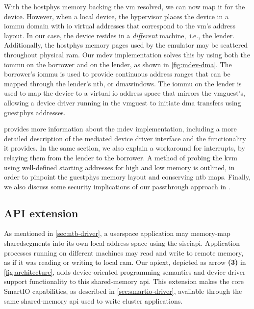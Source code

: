 With the \gls{hostphys} memory backing the \gls{vm} resolved, we can now map it for the device.
%
However, when  a local device, the \gls{hypervisor} places the device in a \gls{iommu} domain with \gls{io} virtual addresses that correspond to the \gls{vm}'s address layout.
%
In our case, the device resides in a \emph{different} machine,~i.e., the \gls{lender}.
%
Additionally, the \gls{hostphys} memory pages used by the \gls{emulator} may be scattered throughout physical \gls{ram}.
%
Our \gls{mdev} implementation solves this by using both the \gls{iommu} on the \gls{borrower} and on the \gls{lender}, as shown in \cref{fig:mdev-dma}.
%
The \gls{borrower}'s \gls{iommu} is used to provide continuous address ranges that can be mapped through the \gls{lender}'s \gls{ntb}, or \glspl{dmawindow}.
%
The \gls{iommu} on the \gls{lender} is used to map the device to a virtual \gls{io} address space that mirrors the \gls{vmguest}'s, allowing a device driver running in the \gls{vmguest} to initiate \gls{dma} transfers using \gls{guestphys} addresses.


 provides more information about the \gls{mdev} implementation, including a more detailed description of the mediated device driver interface and the functionality it provides. 
%
In the same section, we also explain a workaround for interrupts, by relaying them from the \gls{lender} to the \gls{borrower}.
%
A method of probing the \gls{kvm} using well-defined starting addresses for high and low memory is outlined, in order to pinpoint the \gls{guestphys} memory layout and conserving \gls{ntb} maps.
%
Finally, we also discuss some security implications of our \gls{passthrough} approach in .



\subsection{API extension}\label{sec:api}
As mentioned in \cref{sec:ntb-driver}, a \gls{userspace} application may memory-map \glspl{sharedsegment} into its own local address space using the \gls{sisciapi}.
%
Application processes running on different machines may read and write to remote memory, as if it was reading or writing to local \gls{ram}.
%
Our \gls{apiext}, depicted as arrow \textbf{(3)} in \cref{fig:architecture}, adds device-oriented programming semantics and device driver support functionality to this shared-memory \gls{api}.
%
This extension makes the core SmartIO capabilities, as described in \cref{sec:smartio-driver}, available through the same shared-memory \gls{api} used to write cluster applications.



